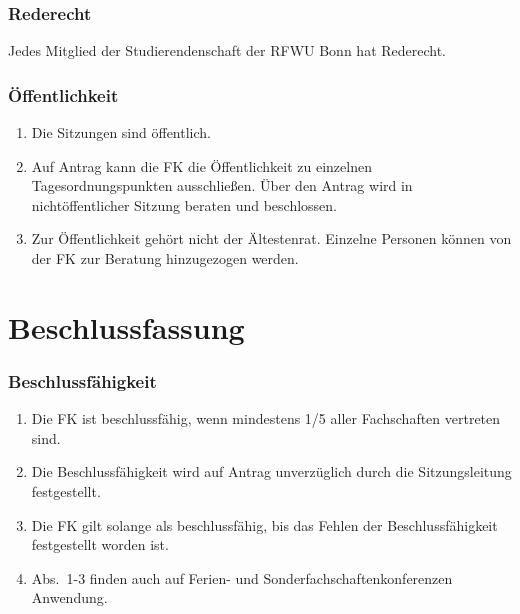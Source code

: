 \documentclass{article}
\begin{document}
\section{Rederecht}
Jedes Mitglied der Studierendenschaft der RFWU Bonn hat Rederecht.

\section{Öffentlichkeit}
\begin{enumerate}[(1)]
    \item Die Sitzungen sind öffentlich.
    \item Auf Antrag kann die FK die Öffentlichkeit zu einzelnen Tagesordnungspunkten ausschließen.
    	Über den Antrag wird in nichtöffentlicher Sitzung beraten und beschlossen.
    \item Zur Öffentlichkeit gehört nicht der Ältestenrat.
    	Einzelne Personen können von der FK zur Beratung hinzugezogen werden.
\end{enumerate}

\part{Beschlussfassung}
\section{Beschlussfähigkeit}
\begin{enumerate}[(1)]
    \item Die FK ist beschlussfähig, wenn mindestens 1/5 aller Fachschaften vertreten sind.
    \item Die Beschlussfähigkeit wird auf Antrag unverzüglich durch die Sitzungsleitung festgestellt.
    \item Die FK gilt solange als beschlussfähig, bis das Fehlen der Beschlussfähigkeit festgestellt worden ist.
    \item Abs.\ 1-3 finden auch auf Ferien- und Sonderfachschaftenkonferenzen Anwendung.
\end{enumerate}
\end{document}
